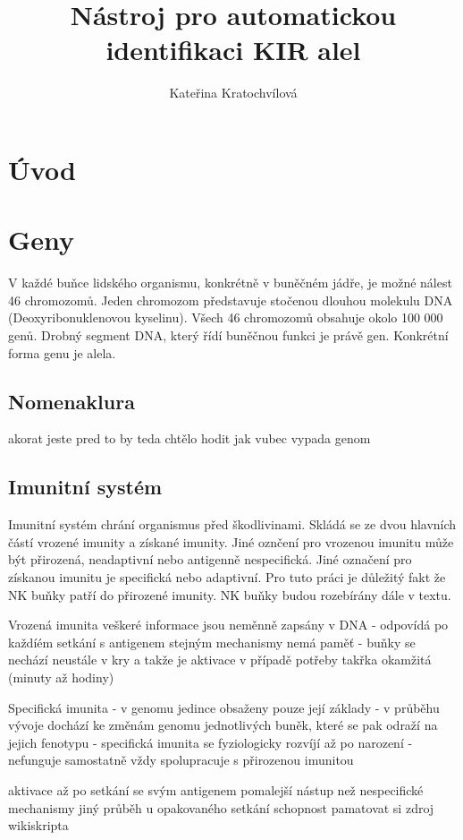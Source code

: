 \documentclass[czech,DP]{thesiskiv}
\author{Kateřina Kratochvílová}
\title{Nástroj pro automatickou identifikaci KIR alel}
\begin{document}
%
\maketitle
\tableofcontents

\chapter{Úvod}
\chapter{Geny}
V každé buňce lidského organismu, konkrétně v buněčném jádře, je možné nálest 46 chromozomů. Jeden chromozom představuje stočenou dlouhou molekulu DNA (Deoxyribonuklenovou kyselinu). Všech 46 chromozomů obsahuje okolo 100 000 genů. Drobný segment DNA, který řídí buněčnou funkci je právě gen. Konkrétní forma genu je alela. \citep{en_smith}
\section{Nomenaklura}
akorat jeste pred to by teda chtělo hodit jak vubec vypada genom

\section{Imunitní systém}
Imunitní systém chrání organismus před škodlivinami. Skládá se ze dvou hlavních částí vrozené imunity a získané imunity. Jiné oznčení pro vrozenou imunitu může být přirozená, neadaptivní nebo antigenně nespecifická. Jiné označení pro získanou imunitu je specifická nebo adaptivní.
Pro tuto práci je důležitý fakt že NK buňky patří do přirozené imunity. NK buňky budou rozebírány dále v textu.

Vrozená imunita veškeré informace jsou neměnně zapsány v DNA 
- odpovídá po každíém setkání s antigenem stejným mechanismy nemá paměť
- buňky se nechází neustále v kry a takže je aktivace v případě potřeby takřka okamžitá (minuty až hodiny)

Specifická imunita
- v genomu jedince obsaženy pouze její základy
- v průběhu vývoje dochází ke změnám genomu jednotlivých buněk, které se pak odraží na jejich fenotypu
- specifická imunita se fyziologicky rozvíjí až po narození
- nefunguje samostatně vždy spolupracuje s přirozenou imunitou

aktivace až po setkání se svým antigenem
pomalejší nástup než nespecifické mechanismy
jiný průběh u opakovaného setkání
schopnost pamatovat si
zdroj wikiskripta
\end{document}
